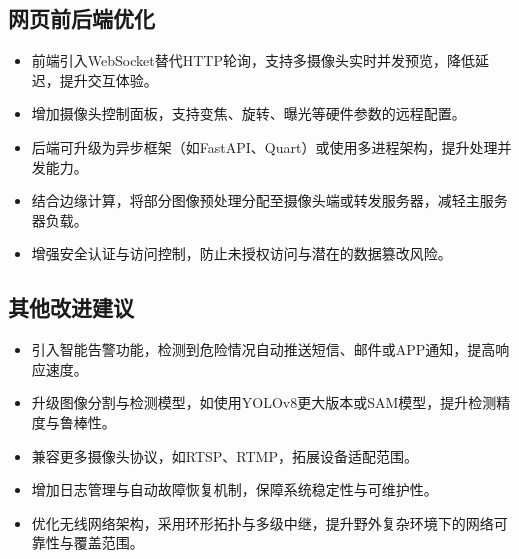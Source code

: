 \subsection{网页前后端优化}

\begin{itemize}[leftmargin=*]
  \item 前端引入WebSocket替代HTTP轮询，支持多摄像头实时并发预览，降低延迟，提升交互体验。
  \item 增加摄像头控制面板，支持变焦、旋转、曝光等硬件参数的远程配置。
  \item 后端可升级为异步框架（如FastAPI、Quart）或使用多进程架构，提升处理并发能力。
  \item 结合边缘计算，将部分图像预处理分配至摄像头端或转发服务器，减轻主服务器负载。
  \item 增强安全认证与访问控制，防止未授权访问与潜在的数据篡改风险。
\end{itemize}

\subsection{其他改进建议}

\begin{itemize}[leftmargin=*]
  \item 引入智能告警功能，检测到危险情况自动推送短信、邮件或APP通知，提高响应速度。
  \item 升级图像分割与检测模型，如使用YOLOv8更大版本或SAM模型，提升检测精度与鲁棒性。
  \item 兼容更多摄像头协议，如RTSP、RTMP，拓展设备适配范围。
  \item 增加日志管理与自动故障恢复机制，保障系统稳定性与可维护性。
  \item 优化无线网络架构，采用环形拓扑与多级中继，提升野外复杂环境下的网络可靠性与覆盖范围。
\end{itemize}


